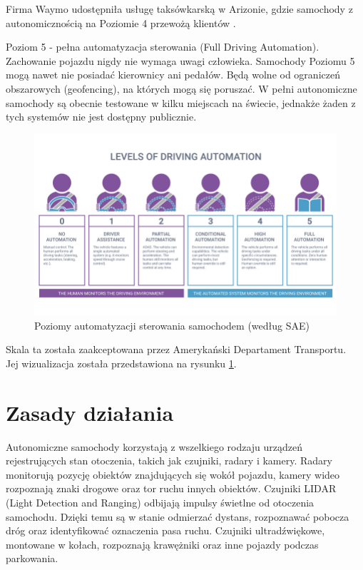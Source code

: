 \begin{enumerate*}
\begin{itemize*}
\item Firma Waymo udostępniła usługę taksówkarską w Arizonie, gdzie samochody z autonomicznością na Poziomie 4 przewożą klientów  \cite{waymoAutonomousTaxi}.
\end{itemize*}
\item Poziom 5 - pełna automatyzacja sterowania (Full Driving Automation). Zachowanie pojazdu nigdy nie wymaga uwagi człowieka. Samochody Poziomu 5 mogą nawet nie posiadać kierownicy ani pedałów. Będą wolne od ograniczeń obszarowych (geofencing), na których mogą się poruszać. W pełni autonomiczne samochody są obecnie testowane w kilku miejscach na świecie, jednakże żaden z tych systemów nie jest dostępny publicznie.
\end{enumerate*}

\begin{figure}[h]
\begin{center}
\includegraphics[width=15cm]{resources/figures/automation_levels.jpg}
\caption{Poziomy automatyzacji sterowania samochodem (według SAE)}
\label{CarAutomationLevels}
\end{center}
\end{figure}

Skala ta została zaakceptowana przez Amerykański Departament Transportu. \\
Jej wizualizacja została przedstawiona na rysunku \ref{CarAutomationLevels}.

\section{Zasady działania}
Autonomiczne samochody korzystają z wszelkiego rodzaju urządzeń rejestrujących stan otoczenia, takich jak czujniki, radary i kamery. Radary monitorują pozycję obiektów znajdujących się wokół pojazdu, kamery wideo rozpoznają znaki drogowe oraz tor ruchu innych obiektów. Czujniki LIDAR (Light Detection and Ranging) odbijają impulsy świetlne od otoczenia samochodu. Dzięki temu są w stanie odmierzać dystans, rozpoznawać pobocza dróg oraz identyfikować oznaczenia pasa ruchu.
Czujniki ultradźwiękowe, montowane w kołach, rozpoznają krawężniki oraz inne pojazdy podczas parkowania.


